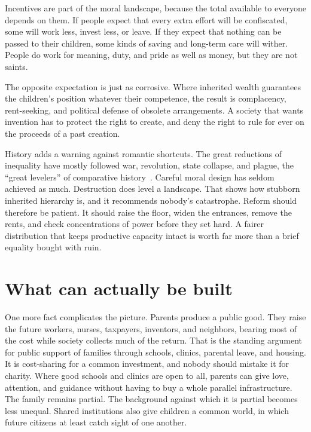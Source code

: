 \documentclass[12pt,a4paper]{book}
\begin{document}
Incentives are part of the moral landscape, because the total available to everyone depends on them. If people expect that every extra effort will be confiscated, some will work less, invest less, or leave. If they expect that nothing can be passed to their children, some kinds of saving and long-term care will wither. People do work for meaning, duty, and pride as well as money, but they are not saints.

The opposite expectation is just as corrosive. Where inherited wealth guarantees the children's position whatever their competence, the result is complacency, rent-seeking, and political defense of obsolete arrangements. A society that wants invention has to protect the right to create, and deny the right to rule for ever on the proceeds of a past creation.

History adds a warning against romantic shortcuts. The great reductions of inequality have mostly followed war, revolution, state collapse, and plague, the ``great levelers'' of comparative history~\cite{Scheidel-2017}. Careful moral design has seldom achieved as much. Destruction does level a landscape. That shows how stubborn inherited hierarchy is, and it recommends nobody's catastrophe. Reform should therefore be patient. It should raise the floor, widen the entrances, remove the rents, and check concentrations of power before they set hard. A fairer distribution that keeps productive capacity intact is worth far more than a brief equality bought with ruin.

\section{What can actually be built}

One more fact complicates the picture. Parents produce a public good. They raise the future workers, nurses, taxpayers, inventors, and neighbors, bearing most of the cost while society collects much of the return. That is the standing argument for public support of families through schools, clinics, parental leave, and housing. It is cost-sharing for a common investment, and nobody should mistake it for charity. Where good schools and clinics are open to all, parents can give love, attention, and guidance without having to buy a whole parallel infrastructure. The family remains partial. The background against which it is partial becomes less unequal. Shared institutions also give children a common world, in which future citizens at least catch sight of one another.
\end{document}
